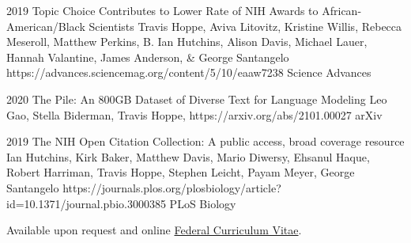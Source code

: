 \documentclass[]{scrartcl}
\begin{document}
\begin{cleanCV}
\Paper
{2019}
{Topic Choice Contributes to Lower Rate of NIH Awards to African-American/Black Scientists}
{Travis Hoppe, Aviva Litovitz, Kristine Willis, Rebecca Meseroll, Matthew Perkins, B. Ian Hutchins, Alison Davis, Michael Lauer, Hannah Valantine, James Anderson, \& George Santangelo}
{https://advances.sciencemag.org/content/5/10/eaaw7238}
{Science Advances}

\Paper
{2020}
{The Pile: An 800GB Dataset of Diverse Text for Language Modeling}
{Leo Gao, Stella Biderman, Travis Hoppe, \etal}
{https://arxiv.org/abs/2101.00027}
{arXiv}

\Paper
{2019}
{The NIH Open Citation Collection: A public access, broad coverage resource}
{Ian Hutchins, Kirk Baker, Matthew Davis, Mario Diwersy, Ehsanul Haque, Robert Harriman, Travis Hoppe, Stephen Leicht, Payam Meyer, George Santangelo}
{https://journals.plos.org/plosbiology/article?id=10.1371/journal.pbio.3000385}
{PLoS Biology}





Available upon request and online \href{https://github.com/thoppe/personal_cv/blob/master/tex/pdf/Travis_Hoppe_Federal_Resume.pdf?raw=true}{Federal Curriculum Vitae}.


\end{cleanCV}
\end{document}

